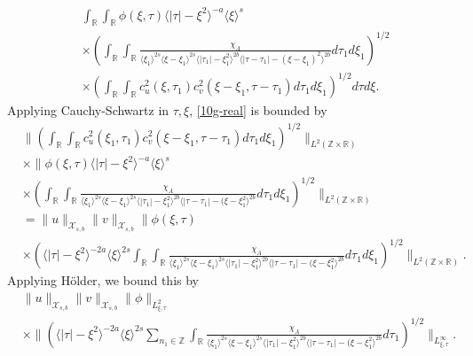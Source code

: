 \documentclass[12pt,reqno]{amsart}
\numberwithin{equation}{section}  %
\numberwithin{figure}{section}
\newcommand{\rr}{\mathbb{R}}
\newcommand{\zz}{\mathbb{Z}}
\theoremstyle{plain}
\theoremstyle{definition}
\theoremstyle{remark}
\begin{document}
\begin{equation}
	\label{10g-real}
	\begin{split}
    & \int_{\rr} \int_{\rr} \phi(\xi, \tau) \langle | \tau | - \xi^{2} \rangle
    ^{-a} \langle \xi \rangle ^{s}
    \\
    & \times \left( \int_{\rr} \int_{\rr}
    \frac{\chi_{A}}{\langle \xi_{1} \rangle ^{2s} \langle \xi-\xi_{1} \rangle ^{2s} \langle |
    \tau_{1} | - \xi_{1}^{2}\rangle ^{2b} \langle | \tau - \tau_{1} | -
    (\xi - \xi_{1})^{2} \rangle ^{2b}} d \tau_{1} d \xi_{1} \right)^{1/2}
    \\
    & \times \left( \int_{\rr} \int_{\rr} c_{u}^{2}(\xi, \tau_{1})
    c_{v}^{2}(\xi - \xi_{1}, \tau - \tau_{1}) d \tau_{1} d \xi_{1}
    \right)^{1/2} d \tau d
    \xi.
  \end{split}
\end{equation}
%
%
Applying Cauchy-Schwartz in $\tau, \xi$, \eqref{10g-real} is bounded by
%
%
\begin{equation*}
  \begin{split}
    & \|\left( \int_{\rr} \int_{\rr } c_{u}^{2}(\xi_1, \tau_1)
  c_{v}^{2} (\xi - \xi_1, \tau - \tau_{1} ) d \tau_1 d \xi_{1}  \right)^{1/2} \|_{L^{2}(\zz \times
		\rr)}
		\\
    & \times  \|\phi(\xi, \tau) \langle | \tau | - \xi^{2} \rangle ^{-a} \langle \xi
    \rangle ^{s}
		\\
    & \times \left( \int_{\rr} \int_{\rr} \frac{\chi_{A}}{ \langle \xi_{1}
    \rangle ^{2s} \langle \xi-\xi_{1} \rangle ^{2s} \langle | \tau_{1}|-\xi_{1}^{2}
    \rangle^{2b} \langle  |\tau -
    \tau_{1} | -(\xi - \xi_{1}^{2}
    \rangle^{2b} } d \tau_1 d \xi_{1} \right)^{1/2} \|_{L^2(\zz \times \rr)}
		\\
    & = \|u\|_{\mathcal{X}_{s,b}} \|v\|_{\mathcal{X}_{s,b}} \label{holder-term-real}
     \|\phi(\xi, \tau)     \\
    & \times \left( \langle | \tau | - \xi^{2} \rangle ^{-2a} \langle \xi
    \rangle ^{2s}
    \int_{\rr} \int_{\rr} \frac{\chi_{A}}{ \langle \xi_{1} \rangle ^{2s} \langle
\xi-\xi_{1} \rangle ^{2s}  \langle | \tau_{1}|-\xi_{1}^{2} \rangle^{2b} \langle  |\tau -
    \tau_{1} | -(\xi - \xi_{1}^{2}
    \rangle^{2b} } d \tau_1 d \xi_{1} \right)^{1/2} \|_{L^2(\zz \times \rr)}.
  \end{split}
\end{equation*}
%
Applying H{\"o}lder, we bound this by 
%
%
\begin{equation}
  \label{integral-bound-1st-form}
	\begin{split}
    & \|u\|_{\mathcal{X}_{s,b}} \|v\|_{\mathcal{X}_{s,b}} \| \phi \|_{L^{2}_{\xi, \tau}}
    \\
    & \times \|\left( \langle | \tau | - \xi^{2} \rangle ^{-2a} \langle \xi
    \rangle ^{2s}
    \sum_{n_{1} \in \zz} \int_{\rr} \frac{\chi_{A}}{ \langle \xi_{1} \rangle ^{2s} \langle
\xi-\xi_{1} \rangle ^{2s} \langle | \tau_{1}|-\xi_{1}^{2} \rangle^{2b} \langle  |\tau -
    \tau_{1} | -(\xi - \xi_{1}^{2}
    \rangle ^{2b} } d \tau_1 \right)^{1/2} \|_{L^\infty_{\xi, \tau}}.
	\end{split}
\end{equation}
\end{document}

